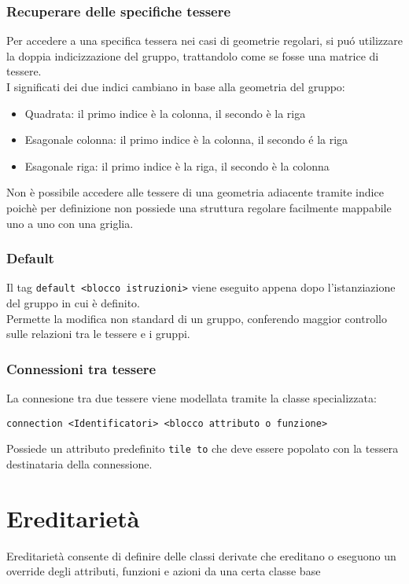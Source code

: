 \subsubsection{Recuperare delle specifiche tessere}
Per accedere a una specifica tessera nei casi di geometrie regolari, si puó utilizzare la doppia
indicizzazione del gruppo, trattandolo come se fosse una matrice di tessere. \\
I significati dei due indici cambiano in base alla geometria del gruppo:
\begin{itemize}
    \item Quadrata: il primo indice è la colonna, il secondo è la riga
    \item Esagonale colonna: il primo indice è la colonna, il secondo é la riga
    \item Esagonale riga: il primo indice è la riga, il secondo è la colonna
\end{itemize}
Non è possibile accedere alle tessere di una geometria adiacente tramite indice poichè per definizione
non possiede una struttura regolare facilmente mappabile uno a uno con una griglia. 

\subsubsection{Default}
Il tag \lstinline|default <blocco istruzioni>| viene eseguito appena dopo l'istanziazione 
del gruppo in cui è definito. \\
Permette la modifica non standard di un gruppo, conferendo maggior controllo sulle relazioni tra le tessere 
e i gruppi.

\subsubsection{Connessioni tra tessere}
La connesione tra due tessere viene modellata tramite la classe specializzata:
\begin{lstlisting}
connection <Identificatori> <blocco attributo o funzione>
\end{lstlisting}
Possiede un attributo predefinito \lstinline|tile to| che deve essere popolato con la tessera 
destinataria della connessione.

\section{Ereditarietà}
Ereditarietà consente di definire delle classi derivate che ereditano o eseguono un override degli attributi, funzioni e azioni 
da una certa classe base
